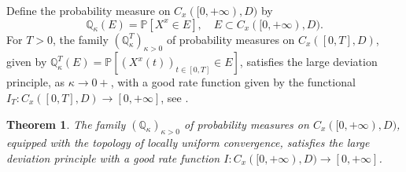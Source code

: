 \documentclass[11pt]{article}
\numberwithin{equation}{section}
\newtheorem{theorem}{Theorem}[section]
\theoremstyle{definition}
\begin{document}
Define the probability measure on $C_{x}([0,+\infty),D)$ by
\[  
    \mathbb{Q}_{\kappa}(E) = \mathbb{P}[X^{x}\in E], \quad E\subset C_{x}([0,+\infty),D).
\]
For $T>0$, the family $(\mathbb{Q}_{\kappa}^{T})_{\kappa>0}$ of probability measures on $C_{x}([0,T],D)$, given by  $\mathbb{Q}_{\kappa}^{T}(E) = \mathbb{P}[(X^{x}(t))_{t\in [0,T]}\in E]$, satisfies the large deviation principle, as $\kappa\to 0+$, with a good rate function given by the functional $I_{T}:C_{x}([0,T],D)\to[0,+\infty]$, see \cite[Theorem 1.8]{abuzaid2024large}.
\begin{theorem}\label{thm::extended_LDP}
The family $(\mathbb{Q}_{\kappa})_{\kappa>0}$ of probability measures on $ C_{x}([0,+\infty),D)$, equipped with the topology of locally uniform convergence, satisfies the large deviation principle with a good rate function $I:C_{x}([0,+\infty),D)\to[0,+\infty]$.
\end{theorem}
\end{document}
